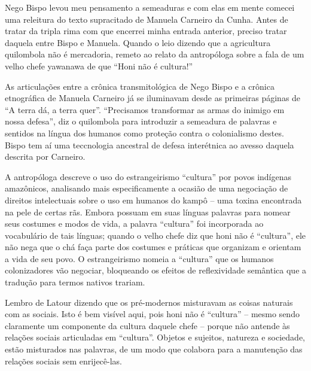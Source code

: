 
Nego Bispo levou meu pensamento a semeaduras e com elas em mente comecei uma releitura do texto supracitado de Manuela Carneiro da Cunha. Antes de tratar da tripla rima com que encerrei minha entrada anterior, preciso tratar daquela entre Bispo e Manuela. Quando o leio dizendo que a agricultura quilombola não é mercadoria, remeto ao relato da antropóloga sobre a fala de um velho chefe yawanawa de que \enquote{Honi não é cultura!}

As articulações entre a crônica transmitológica de Nego Bispo e a crônica etnográfica de Manuela Carneiro já se iluminavam desde as primeiras páginas de \enquote{A terra dá, a terra quer}. \enquote{Precisamos transformar as armas do inimigo em nossa defesa}, diz o quilombola para introduzir a semeadura de palavras e sentidos na língua dos humanos como proteção contra o colonialismo destes. Bispo tem aí uma teccnologia ancestral de defesa interétnica ao avesso daquela descrita por Carneiro.

A antropóloga descreve o uso do estrangeirismo \enquote{cultura} por povos indígenas amazônicos, analisando mais especificamente a ocasião de uma negociação de direitos intelectuais sobre o uso em humanos do kampô --  uma toxina encontrada na pele de certas rãs. Embora possuam em suas línguas palavras para nomear seus costumes e modos de vida, a palavra \enquote{cultura} foi incorporada ao vocabulário de tais línguas; quando o velho chefe diz que honi não é \enquote{cultura}, ele não nega que o chá faça parte dos costumes e práticas que organizam e orientam a vida de seu povo. O estrangeirismo nomeia a \enquote{cultura} que os humanos colonizadores vão negociar, bloqueando os efeitos de reflexividade semântica que a tradução para termos nativos trariam.

Lembro de Latour dizendo que os pré-modernos misturavam as coisas naturais com as sociais. Isto é bem visível aqui, pois honi não é \enquote{cultura} -- mesmo sendo claramente um componente da cultura daquele chefe -- porque não antende às relações sociais articuladas em \enquote{cultura}. Objetos e sujeitos, natureza e sociedade, estão misturados nas palavras, de um modo que colabora para a manutenção das relações sociais sem enrijecê-las.

